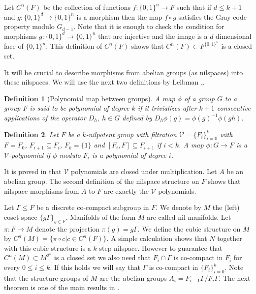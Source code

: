 \documentclass [11pt] {article}
\newtheorem{definition}{Definition}[section]
\begin{document}
Let $C^n(F)$ be the collection of functions $f:\{0,1\}^n\rightarrow F$ such that if $d\leq k+1$ and $g:\{0,1\}^d\rightarrow \{0,1\}^n$ is a morphism then the map $f\circ g$ satisfies the Gray code property modulo $G_{d-1}$.  
Note that it is enough to check the condition for morphisms $g:\{0,1\}^d\rightarrow\{0,1\}^n$ that are injective and the image is a $d$ dimensional face of $\{0,1\}^n$. 
This definition of $C^n(F)$ shows that $C^n(F)\subset F^{\{0,1\}^n}$ is a closed set. 

It will be crucial to describe morphisms from abelian groups (as nilspaces) into these nilspaces.
We will use the next two definitions by Leibman \cite{Lei},\cite{Lei2}.

\begin{definition}[Polynomial map between groups] A map $\phi$ of a group $G$ to a group $F$ is said to be polynomial of degree $k$ if it trivializes after $k+1$ consecutive applications of the operator $D_h,~h\in G$ defined by $D_h\phi(g)=\phi(g)^{-1}\phi(gh).$
\end{definition}

\begin{definition} Let $F$ be a $k$-nilpotent group with filtration $\mathcal{V}=\{F_i\}_{i=0}^k$ with $F=F_0$, $F_{i+1}\subseteq F_i$, $F_k=\{1\}$ and $[F_i,F]\subseteq F_{i+1}$ if $i<k$. A map $\phi:G\rightarrow F$ is a $\mathcal{V}$-polynomial if $\phi$ modulo $F_i$ is a polynomial of degree $i$.
\end{definition}

It is proved in \cite{Lei2} that $\mathcal{V}$ polynomials are closed under multiplication. 
Let $A$ be an abelian group. The second definition of the nilspace structure on $F$ shows that nilspace morphisms from $A$ to $F$ are exactly the $\mathcal{V}$ polynomials. 

\medskip

Let $\Gamma\leq F$ be a discrete co-compact subgroup in $F$. 
We denote by $M$ the (left) coset space $\{g\Gamma\}_{g\in F}$. Manifolds of the form $M$ are called nil-manifolds. 
Let $\pi:F\rightarrow M$ denote the projection $\pi(g)=g\Gamma$. We define the cubic structure on $M$ by $C^n(M)=\{\pi\circ c|c\in C^n(F)\}$. A simple calculation shows that $N$ together with this cubic structure is a $k$-step nilspace. However to guarantee that $C^n(M)\subset M^{2^n}$ is a closed set we also need that $F_i\cap\Gamma$ is co-compact in $F_i$ for every $0\leq i\leq k$. If this holds we will say that $\Gamma$ is co-compact in $\{F_i\}_{i=0}^k$.
Note that the structure groups of $M$ are the abelian groups $A_i=F_{i-1}\Gamma/F_i\Gamma$. 
The next theorem is one of the main results in \cite{NP}.
\end{document}
